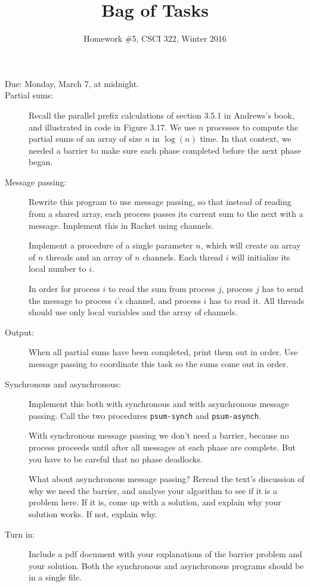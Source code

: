 \documentclass{article}
\title{Bag of Tasks}
\author{Homework \#5, CSCI 322, Winter 2016}
\date{}
\begin{document}
\maketitle

\begin{description}

\item[Due:  Monday, March 7, at  midnight.]

\item[Partial sums:] Recall the parallel prefix calculations of
  section 3.5.1 in Andrews's book, and illustrated in code in Figure
  3.17.   We use $n$ processes to compute the partial sums of an array
  of size $n$ in $\log(n)$ time.
  In that context, we needed a barrier to make sure each phase
  completed before the next phase began.

\item[Message passing:]
  Rewrite this program to use message passing, so that instead of
  reading from a shared array, each process passes its current sum to
  the next with a message.  Implement this in Racket using channels.

  Implement a procedure of a single parameter $n$, which will create
  an array of $n$ threads and an array of $n$ channels.  Each thread
  $i$ will initialize its local number to $i$.

  In order for
  process $i$ to read the sum from process $j$, process $j$ has to
  send the message to process $i$'s channel, and process $i$ has to
  read it.  All threads should use only local variables and the
  array of channels. 

\item[Output:]  When all partial sums have been completed, print them
  out in order.  Use message passing to coordinate this task so the
  sums come out in order.

\item[Synchronous and asynchronous:] Implement this both with
  synchronous and with asynchronous message passing.  Call the two
  procedures {\tt psum-synch} and {\tt psum-asynch}.
  
  With synchronous message passing we don't need a barrier, because no
  process proceeds until after all messages at each phase are
  complete.  But you have to be careful that no phase deadlocks.

  What about asynchronous message passing?  Reread the text's
  discussion of why we need the barrier, and analyse your algorithm to
  see if it is a problem here.  If it is, come up with a solution, and
  explain why your solution works.  If not, explain why.

\item[Turn in:] Include a pdf document with your explanations of the
  barrier problem and your solution.  Both the synchronous and
  asynchronous programs should be in a single file.
\end{description}
\end{document}
